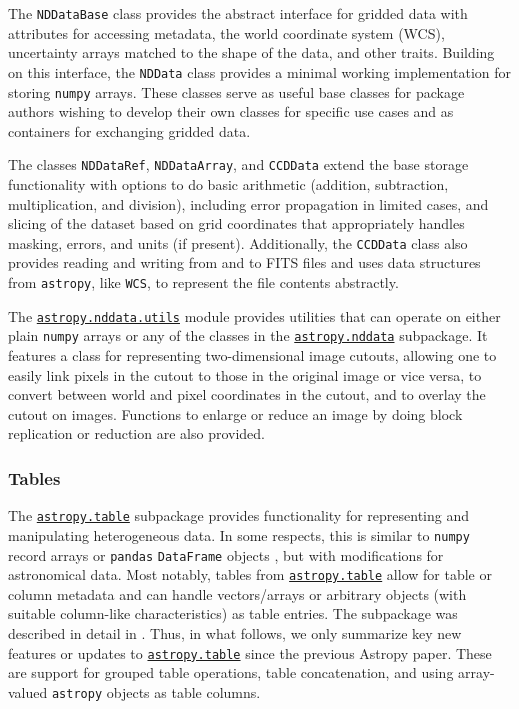 \documentclass[modern]{aastex62}
\newcommand{\package}[1]{\texttt{#1}\xspace}
\newcommand{\astropy}{Astropy\xspace}
\newcommand{\astropypkg}{\package{astropy}}
\newcommand{\astropysubpkg}[1]{\href{http://docs.astropy.org/en/stable/#1/index.html}{\texttt{astropy.#1}}\xspace}
\begin{document}
The \texttt{NDDataBase} class provides the abstract interface for gridded data
with attributes for accessing metadata, the world coordinate system (WCS),
uncertainty arrays matched to the shape of the data, and other traits.
Building on this interface, the \texttt{NDData} class provides a minimal
working implementation for storing \package{numpy} arrays. These classes serve
as useful base classes for package authors wishing to develop their own classes
for specific use cases and as containers for exchanging gridded data.

The classes \texttt{NDDataRef}, \texttt{NDDataArray}, and \texttt{CCDData}
extend the base storage functionality with options to do basic arithmetic
(addition, subtraction, multiplication, and division), including error
propagation in limited cases, and slicing of the dataset based on grid
coordinates that appropriately handles masking, errors, and units (if present).
Additionally, the \texttt{CCDData} class also provides reading and writing from
and to FITS files and uses data structures from \astropypkg, like \texttt{WCS},
to represent the file contents abstractly.

The \href{http://docs.astropy.org/en/stable/nddata/utils.html}
{\package{astropy.nddata.utils}} module provides utilities that can operate
on either plain \package{numpy} arrays or any of the classes in the
\astropysubpkg{nddata} subpackage. It features a class for representing
two-dimensional image cutouts, allowing one to easily link pixels in the cutout
to those in the original image or vice versa, to convert
between world and pixel coordinates in the cutout, and to overlay the cutout
on images. Functions to enlarge or reduce an image by doing block replication
or reduction are also provided.

\subsubsection{Tables}
\label{sec:table}

The \astropysubpkg{table} subpackage provides functionality for
representing and manipulating heterogeneous data. In some respects,
this is similar to \package{numpy} record arrays \citep{numpy} or
\package{pandas} \texttt{DataFrame} objects \citep{pandas}, but with modifications for
astronomical data. Most notably, tables from \astropysubpkg{table}
allow for table or column metadata and can handle
vectors/arrays or arbitrary objects (with suitable column-like characteristics)
as table entries. The subpackage was described in
detail in \cite{astropy}.  Thus, in what follows, we only summarize
key new features or updates to \astropysubpkg{table} since the
previous \astropy paper. These are support for grouped table
operations, table concatenation, and using array-valued
\package{astropy} objects as table columns.
\end{document}
